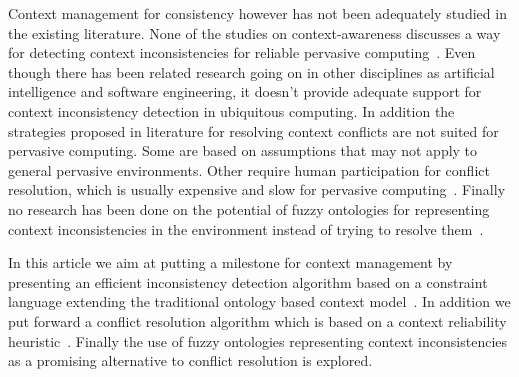 \documentclass[journal]{vgtc}                %
\begin{document}
Context management for consistency however has not been adequately studied in the existing literature. None of the studies on context-awareness discusses a way for detecting context inconsistencies for reliable pervasive computing~\cite{xu:2010:PCC, bu:2006:CCM}. Even though there has been related research going on in other disciplines as artificial intelligence and software engineering, it doesn't provide adequate support for context inconsistency detection in ubiquitous computing. In addition the strategies proposed in literature for resolving context conflicts are not suited for pervasive computing. Some are based on assumptions that may not apply to general pervasive environments. Other require human participation for conflict resolution, which is usually expensive and slow for pervasive computing~\cite{xu:2010:PCC}. Finally no research has been done on the potential of fuzzy ontologies for representing context inconsistencies in the environment instead of trying to resolve them~\cite{ko:2009:IOFO}.

In this article we aim at putting a milestone for context management by presenting an efficient inconsistency detection algorithm based on a constraint language extending the traditional ontology based context model~\cite{xu:2010:PCC}. In addition we put forward a conflict resolution algorithm which is based on a context reliability heuristic~\cite{bu:2006:CCM}. Finally the use of fuzzy ontologies representing context inconsistencies as a promising alternative to conflict resolution is explored.
\end{document}
